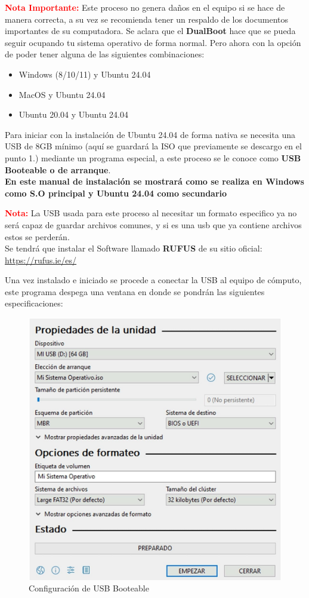 \documentclass[letter,11pt]{article} %
\begin{document}
\begin{enumerate}
		\textbf{\textcolor{red}{Nota Importante:}} Este proceso no genera daños en el equipo si se hace de manera correcta, a su vez se recomienda tener un respaldo de los documentos importantes de su computadora. Se aclara que el \textbf{DualBoot} hace que se pueda seguir ocupando tu sistema operativo de forma normal. Pero ahora con la opción de poder tener alguna de las siguientes combinaciones:
		
		\begin{itemize}
			\item Windows (8/10/11) y Ubuntu 24.04
			\item MacOS y Ubuntu 24.04
			\item Ubuntu 20.04 y Ubuntu 24.04 
		\end{itemize}
		
		Para iniciar con la instalación de Ubuntu 24.04 de forma nativa se necesita una USB de 8GB mínimo (aquí se guardará la ISO que previamente se descargo en el punto 1.) mediante un programa especial, a este proceso se le conoce como \textbf{USB Booteable o de arranque}. \\
		
		\textbf{En este manual de instalación se mostrará como se realiza en Windows como S.O principal y Ubuntu 24.04 como secundario}
		
		\textbf{\textcolor{red}{Nota:}} La USB usada para este proceso al necesitar un formato especifico ya no será capaz de guardar archivos comunes, y si es una usb que ya contiene archivos estos se perderán.\\
		
		Se tendrá que instalar el Software llamado \textbf{RUFUS} de su sitio oficial: \url{https://rufus.ie/es/}
		
		Una vez instalado e iniciado se procede a conectar la USB al equipo de cómputo, este programa despega una ventana en donde se pondrán las siguientes especificaciones:
		
		\begin{figure}[H]
			\centering
			\includegraphics[width=0.5\linewidth]{Imagenes/rufus}
			\caption{Configuración de USB Booteable}
			\label{fig:rufus}
		\end{figure}
		

\end{enumerate}
\end{document}
